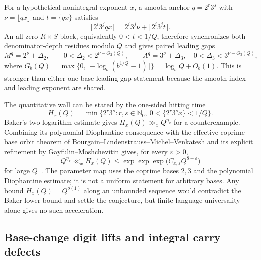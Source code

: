 \documentclass[11pt,oneside]{article}
\theoremstyle{definition}
\theoremstyle{remark}
\newcommand{\Nzero}{\mathbb N_0}
\begin{document}
For a hypothetical nonintegral exponent $x$, a smooth anchor $q=2^r3^s$ with
$\nu=\lfloor qx\rfloor$ and $t=\{qx\}$ satisfies
\[
 \lfloor2^i3^jqx\rfloor=2^i3^j\nu+\lfloor2^i3^jt\rfloor.
\]
An all-zero $R\times S$ block, equivalently $0<t<1/Q$, therefore synchronizes both
denominator-depth residues modulo $Q$ and gives paired leading gaps
\[
 M^q=2^\nu+\Delta_2,\qquad 0<\Delta_2<2^{\nu-G_2(Q)},\qquad
 A^q=3^\nu+\Delta_3,\quad 0<\Delta_3<3^{\nu-G_3(Q)},
\]
where
$G_b(Q)=\max\{0,\lfloor-\log_b(b^{1/Q}-1)\rfloor\}=\log_bQ+O_b(1)$.
This is stronger than either one-base leading-gap statement because the smooth index and
leading exponent are shared.

The quantitative wall can be stated by the one-sided hitting time
\[
 H_x(Q)=\min\{2^r3^s:r,s\in\Nzero,\ 0<\{2^r3^sx\}<1/Q\}.
\]
Baker's two-logarithm estimate gives $H_x(Q)\gg_x Q^{\eta_x}$ for a counterexample.
Combining its polynomial Diophantine consequence with the effective coprime-base orbit
theorem of Bourgain--Lindenstrauss--Michel--Venkatesh and its explicit refinement by
Gayfulin--Moshchevitin gives, for every $\varepsilon>0$,
\begin{equation}
 Q^{\eta_x}\ll_x H_x(Q)
 \le \exp\!\exp\!\exp\bigl(C_{x,\varepsilon}Q^{8+\varepsilon}\bigr)
 \label{carry:eq-hitting-corridor}
\end{equation}
for large $Q$~\cite{Baker1975,BLMV2009,GayfulinMoshchevitin2023}.
The parameter map uses the coprime bases $2,3$ and the polynomial Diophantine estimate;
it is not a uniform statement for arbitrary bases.  Any bound
$H_x(Q)=Q^{o(1)}$ along an unbounded sequence would contradict the Baker lower bound and
settle the conjecture, but finite-language universality alone gives no such acceleration.

\subsection{Base-change digit lifts and integral carry defects}
\label{carry:digit-lifts}
\end{document}
